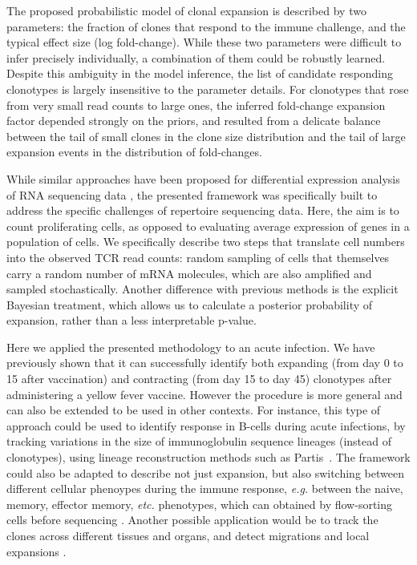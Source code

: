 \documentclass[pre,twocolumn,english,longbibliography]{revtex4}
\newcommand{\<}{\langle}
\renewcommand{\>}{\rangle}
\begin{document}
The proposed probabilistic model of clonal expansion is described by two parameters: the fraction of clones that respond to the immune challenge, and the typical effect size (log fold-change). While these two parameters were difficult to infer precisely individually, a combination of them could be robustly learned. Despite this ambiguity in the model inference, the list of candidate responding clonotypes is largely insensitive to the parameter details. For clonotypes that rose from very small read counts to large ones, the inferred fold-change expansion factor depended strongly on the priors, and resulted from a delicate balance between the tail of small clones in the clone size distribution and the tail of large expansion events in the distribution of fold-changes.

While similar approaches have been proposed for differential expression analysis of RNA sequencing data \cite{Robinson2008,Robinson2010,Anders2010,Love2014}, the presented  framework was specifically built to address the specific challenges of repertoire sequencing data. Here, the aim is to count proliferating cells, as opposed to evaluating average expression of genes in a population of cells. We specifically describe two steps that translate cell numbers into the observed TCR read counts: random sampling of cells that themselves carry a random number of mRNA molecules, which are also amplified and sampled stochastically. Another difference with previous methods is the explicit Bayesian treatment, which allows us to calculate a posterior probability of expansion, rather than a less interpretable p-value.

Here we applied the presented methodology to an acute infection. We have previously shown that it can successfully identify both expanding (from day 0 to 15 after vaccination) and contracting (from day 15 to day 45) clonotypes after administering a yellow fever vaccine. However the procedure is more general and can also be extended to be used in other contexts. For instance, this type of approach could be used to identify response in B-cells during acute infections, by tracking variations in the size of immunoglobulin sequence lineages (instead of clonotypes), using lineage reconstruction methods such as Partis~\cite{Ralph2016a}.
The framework could also be adapted to describe not just expansion, but also switching between different cellular phenoypes during the immune response, {\em e.g.} between the naive, memory, effector memory, {\em etc.} phenotypes, which can obtained by flow-sorting cells before sequencing \cite{Minervina2019}. Another possible application would be to track the clones across different tissues and organs, and detect migrations and local expansions \cite{Kadoki2017}.
\end{document}
